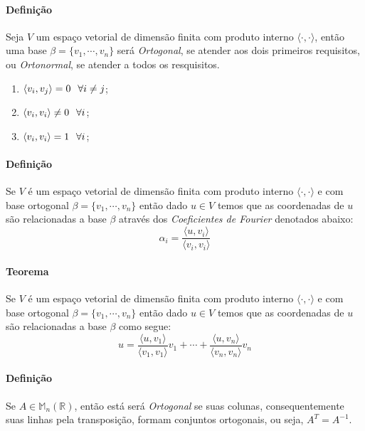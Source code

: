 \documentclass{article}
\begin{document}
        \paragraph{Definição}Seja $V$ um espaço vetorial de dimensão finita com produto interno $\langle\cdot,\cdot\rangle$, então uma base $\beta = \{v_{1}, \cdots, v_{n}\}$ será \textit{Ortogonal}, se atender aos dois primeiros requisitos, ou \textit{Ortonormal}, se atender a todos os resquisitos.
            \begin{enumerate}[noitemsep]
                \item $\langle v_{i}, v_{j} \rangle = 0 \hspace{2.5mm} \forall i \neq j$;
                \item $\langle v_{i}, v_{i} \rangle \neq 0 \hspace{2.5mm} \forall i$;
                \item $\langle v_{i}, v_{i} \rangle = 1 \hspace{2.5mm} \forall i$;
            \end{enumerate}

        \paragraph{Definição}Se $V$ é um espaço vetorial de dimensão finita com produto interno $\langle\cdot,\cdot\rangle$ e com base ortogonal $\beta = \{v_{1}, \cdots, v_{n}\}$ então dado $u \in V$ temos que as coordenadas de $u$ são relacionadas a base $\beta$ através dos \textit{Coeficientes de Fourier} denotados abaixo:
            \[\boxed{\alpha_{i} = \frac{\langle u, v_{i}\rangle}{\langle v_{i}, v_{i}\rangle}}\]

        \paragraph{Teorema}Se $V$ é um espaço vetorial de dimensão finita com produto interno $\langle\cdot,\cdot\rangle$ e com base ortogonal $\beta = \{v_{1}, \cdots, v_{n}\}$ então dado $u \in V$ temos que as coordenadas de $u$ são relacionadas a base $\beta$ como segue:
            \[\boxed{u = \frac{\langle u, v_{1}\rangle}{\langle v_{1}, v_{1}\rangle}v_{1} + \cdots + \frac{\langle u, v_{n}\rangle}{\langle v_{n}, v_{n}\rangle}v_{n}}\]

        \paragraph{Definição}Se $A\in \mathbb{M}_{n}(\mathbb{R})$, então está será \textit{Ortogonal} se suas colunas, consequentemente suas linhas pela transposição, formam conjuntos ortogonais, ou seja, $A^{T} = A^{-1}$.
\end{document}
